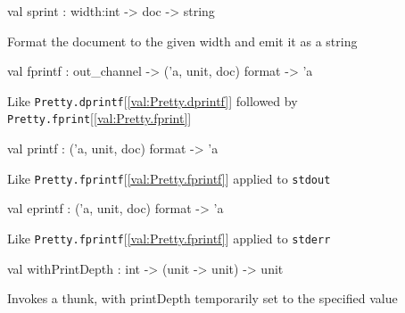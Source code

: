 \documentclass[11pt]{article}
\begin{document}
\label{val:Pretty.sprint}\begin{ocamldoccode}
val sprint : width:int -> doc -> string
\end{ocamldoccode}
\begin{ocamldocdescription}
Format the document to the given width and emit it as a string


\end{ocamldocdescription}




\label{val:Pretty.fprintf}\begin{ocamldoccode}
val fprintf : out_channel -> ('a, unit, doc) format -> 'a
\end{ocamldoccode}
\begin{ocamldocdescription}
Like {\tt{Pretty.dprintf}}[\ref{val:Pretty.dprintf}] followed by {\tt{Pretty.fprint}}[\ref{val:Pretty.fprint}]


\end{ocamldocdescription}




\label{val:Pretty.printf}\begin{ocamldoccode}
val printf : ('a, unit, doc) format -> 'a
\end{ocamldoccode}
\begin{ocamldocdescription}
Like {\tt{Pretty.fprintf}}[\ref{val:Pretty.fprintf}] applied to {\tt{stdout}}


\end{ocamldocdescription}




\label{val:Pretty.eprintf}\begin{ocamldoccode}
val eprintf : ('a, unit, doc) format -> 'a
\end{ocamldoccode}
\begin{ocamldocdescription}
Like {\tt{Pretty.fprintf}}[\ref{val:Pretty.fprintf}] applied to {\tt{stderr}}


\end{ocamldocdescription}




\label{val:Pretty.withPrintDepth}\begin{ocamldoccode}
val withPrintDepth : int -> (unit -> unit) -> unit
\end{ocamldoccode}
\begin{ocamldocdescription}
Invokes a thunk, with printDepth temporarily set to the specified value


\end{ocamldocdescription}
\end{document}
